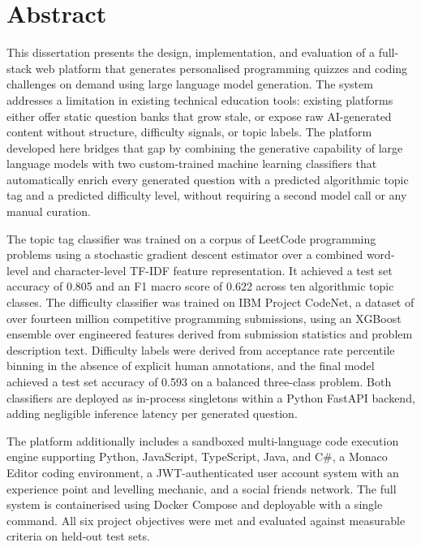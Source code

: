 \chapter*{Abstract}

This dissertation presents the design, implementation, and evaluation
of a full-stack web platform that generates personalised programming
quizzes and coding challenges on demand using large language model
generation. The system addresses a limitation in existing technical education tools: existing platforms either offer static question banks that
grow stale, or expose raw AI-generated content without structure,
difficulty signals, or topic labels. The platform developed here
bridges that gap by combining the generative capability of large
language models with two custom-trained machine learning classifiers
that automatically enrich every generated question with a predicted
algorithmic topic tag and a predicted difficulty level, without
requiring a second model call or any manual curation.

The topic tag classifier was trained on a corpus of LeetCode
programming problems using a stochastic gradient descent estimator
over a combined word-level and character-level TF-IDF feature
representation. It achieved a test set accuracy of 0.805 and an
F1 macro score of 0.622 across ten algorithmic topic classes.
The difficulty classifier was trained on IBM Project CodeNet,
a dataset of over fourteen million competitive programming
submissions, using an XGBoost ensemble over engineered features
derived from submission statistics and problem description text.
Difficulty labels were derived from acceptance rate percentile
binning in the absence of explicit human annotations, and the
final model achieved a test set accuracy of 0.593 on a balanced
three-class problem. Both classifiers are deployed as in-process
singletons within a Python FastAPI backend, adding negligible
inference latency per generated question.

The platform additionally includes a sandboxed multi-language code
execution engine supporting Python, JavaScript, TypeScript, Java,
and C\#, a Monaco Editor coding environment, a JWT-authenticated
user account system with an experience point and levelling
mechanic, and a social friends network. The full system is
containerised using Docker Compose and deployable with a single
command. All six project objectives were met and evaluated against
measurable criteria on held-out test sets.